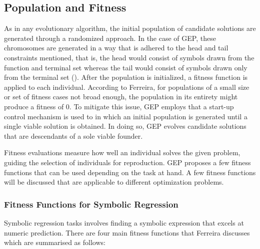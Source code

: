 \subsection{Population and Fitness}
As in any evolutionary algorithm, the initial population of candidate solutions are generated through a randomized approach. In the case of GEP, these chromosomes are generated in a way that is adhered to the head and tail constraints mentioned, that is, the head would consist of symbols drawn from the function and terminal set whereas the tail would consist of symbols drawn only from the terminal set (\cite{ferreira2006gene}). After the population is initialized, a fitness function is applied to each individual. According to Ferreira, for populations of a small size or set of fitness cases not broad enough, the population in its entirety might produce a fitness of 0. To mitigate this issue, GEP employs that a start-up control mechanism is used to in which an initial population is generated until a single viable solution is obtained. In doing so, GEP evolves candidate solutions that are descendants of a sole viable founder.

\parbreak\noindent Fitness evaluations measure how well an individual solves the given problem, guiding the selection of individuals for reproduction. GEP proposes a few fitness functions that can be used depending on the task at hand. A few fitness functions will be discussed that are applicable to different optimization problems.

\subsubsection{Fitness Functions for Symbolic Regression}
Symbolic regression tasks involves finding a symbolic expression that excels at numeric prediction. There are four main fitness functions that Ferreira discusses which are summarised as follows:

